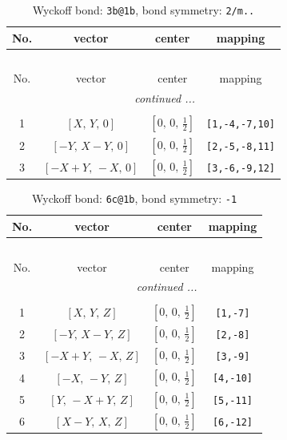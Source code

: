 \documentclass[fleqn,8pt]{jsarticle}
\begin{document}
\renewcommand{\arraystretch}{1.2}
\begin{longtable}{cccc}
\caption{Wyckoff bond: {\tt 3b@1b}, bond symmetry: {\tt 2/m..}}
 \\
 \hline \hline
No. & vector & center & mapping \\ \hline \endfirsthead

\multicolumn{3}{l}{\tablename\ \thetable{}} \\
 \hline \hline
No. & vector & center & mapping \\ \hline \endhead

 \hline \hline
\multicolumn{3}{r}{\footnotesize\it continued ...} \\ \endfoot

 \hline \hline
\multicolumn{3}{r}{} \\ \endlastfoot

1 & $\left[ X,\, Y,\, 0 \right]$ & $\left[ 0,\, 0,\, \frac{1}{2} \right]$ & {\tt [1,-4,-7,10]} \\ \hline
2 & $\left[ - Y,\, X - Y,\, 0 \right]$ & $\left[ 0,\, 0,\, \frac{1}{2} \right]$ & {\tt [2,-5,-8,11]} \\ \hline
3 & $\left[ - X + Y,\, - X,\, 0 \right]$ & $\left[ 0,\, 0,\, \frac{1}{2} \right]$ & {\tt [3,-6,-9,12]} \\
\end{longtable}
\renewcommand{\arraystretch}{1.2}
\begin{longtable}{cccc}
\caption{Wyckoff bond: {\tt 6c@1b}, bond symmetry: {\tt -1}}
 \\
 \hline \hline
No. & vector & center & mapping \\ \hline \endfirsthead

\multicolumn{3}{l}{\tablename\ \thetable{}} \\
 \hline \hline
No. & vector & center & mapping \\ \hline \endhead

 \hline \hline
\multicolumn{3}{r}{\footnotesize\it continued ...} \\ \endfoot

 \hline \hline
\multicolumn{3}{r}{} \\ \endlastfoot

1 & $\left[ X,\, Y,\, Z \right]$ & $\left[ 0,\, 0,\, \frac{1}{2} \right]$ & {\tt [1,-7]} \\ \hline
2 & $\left[ - Y,\, X - Y,\, Z \right]$ & $\left[ 0,\, 0,\, \frac{1}{2} \right]$ & {\tt [2,-8]} \\ \hline
3 & $\left[ - X + Y,\, - X,\, Z \right]$ & $\left[ 0,\, 0,\, \frac{1}{2} \right]$ & {\tt [3,-9]} \\ \hline
4 & $\left[ - X,\, - Y,\, Z \right]$ & $\left[ 0,\, 0,\, \frac{1}{2} \right]$ & {\tt [4,-10]} \\ \hline
5 & $\left[ Y,\, - X + Y,\, Z \right]$ & $\left[ 0,\, 0,\, \frac{1}{2} \right]$ & {\tt [5,-11]} \\ \hline
6 & $\left[ X - Y,\, X,\, Z \right]$ & $\left[ 0,\, 0,\, \frac{1}{2} \right]$ & {\tt [6,-12]} \\
\end{longtable}
\end{document}

